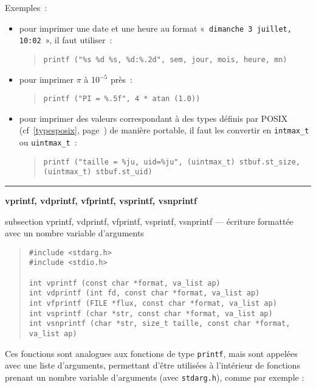 \documentclass [twoside] {report}
\newcommand {\primitive} [1]
    {
	\phantomsection
	{\large \textbf {#1}}
	\addcontentsline {toc} {subsection} {#1}
    }
\newcommand {\separation}
    {
	\vspace {5mm}
	\nopagebreak
	\hrule
    }
\begin{document}
Exemples~:
\begin {itemize}
    \item pour imprimer une date et une heure au format
	«~{\small\texttt{dimanche 3 juillet, 10:02}}~», il faut
	utiliser~:
	    \begin {quote}
		\verb|printf ("%s %d %s, %d:%.2d", sem, jour, mois, heure, mn)|
	    \end {quote}

    \item pour imprimer $\pi$ à 10$^{-5}$ près~:
	    \begin {quote}
		\small
		\verb|printf ("PI = %.5f", 4 * atan (1.0))|
	    \end {quote}

    \item
	\label{printftypesposix}
	pour imprimer des valeurs correspondant à des types définis
	par POSIX (cf~\ref{typesposix}, page~\pageref{typesposix}) de
	manière portable, il faut les convertir en \texttt{intmax\_t}
	ou \texttt{uintmax\_t}~:
	    \begin {quote}
		\small
		\verb|printf ("taille = %ju, uid=%ju", (uintmax_t) stbuf.st_size, (uintmax_t) stbuf.st_uid)|
	    \end {quote}

\end {itemize}

\separation
\primitive {vprintf, vdprintf, vfprintf, vsprintf, vsnprintf} --- écriture formattée avec un nombre variable d'arguments

\begin {quote}
\begin {verbatim}
#include <stdarg.h>
#include <stdio.h>

int vprintf (const char *format, va_list ap)
int vdprintf (int fd, const char *format, va_list ap)
int vfprintf (FILE *flux, const char *format, va_list ap)
int vsprintf (char *str, const char *format, va_list ap)
int vsnprintf (char *str, size_t taille, const char *format, va_list ap)
\end{verbatim}
\end {quote}

Ces fonctions sont analogues aux fonctions de type \texttt {printf}, mais
sont appelées avec une liste d'arguments, permettant d'être utilisées
à l'intérieur de fonctions prenant un nombre variable d'arguments
(avec \texttt {stdarg.h}), comme par exemple :
\end{document}
